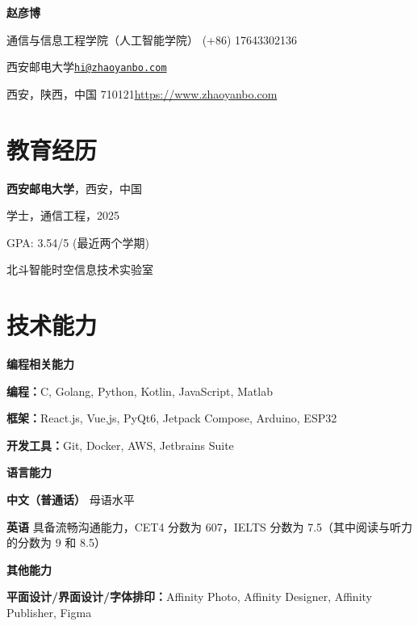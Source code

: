 \documentclass{article}
\newcommand{\cvsection}[1]{\section*{\rmfamily#1}}
\begin{document}
\begin{CJK}{UTF8}{gbsn}

\begin{center}
    \Huge{
    \rmfamily
    \textbf{赵彦博}}
\end{center}
\vspace{20pt}


\setlength{\parskip}{1pt}
\renewcommand{\arraystretch}{1.25}


\noindent 通信与信息工程学院（人工智能学院）  \hfill (+86) 17643302136

\noindent 西安邮电大学\hfill \href{mailto:hi@zhaoyanbo.com}{\texttt{hi@zhaoyanbo.com}}

\noindent 西安，陕西，中国  710121\hfill \url{https://www.zhaoyanbo.com}


\setlength{\parskip}{3pt}


\cvsection{教育经历}
\indent 

\textbf{西安邮电大学}，西安，中国

\hspace{2em}学士，通信工程，2025

\hspace{2em}GPA: 3.54/5 (最近两个学期)

\hspace{2em}北斗智能时空信息技术实验室

\cvsection{技术能力}
\indent 

\textbf{编程相关能力}

\hspace{2em}\textbf{编程：}C, Golang, Python, Kotlin, JavaScript, Matlab

\hspace{2em}\textbf{框架：}React.js, Vue,js, PyQt6, Jetpack Compose, Arduino, ESP32

\hspace{2em}\textbf{开发工具：}Git, Docker, AWS, Jetbrains Suite

\textbf{语言能力}

\hspace{2em}\textbf{中文（普通话）} 母语水平

\hspace{2em}\textbf{英语} 具备流畅沟通能力，CET4 分数为 607，IELTS 分数为 7.5（其中阅读与听力的分数为 9 和 8.5）


\textbf{其他能力}


\hspace{2em}\textbf{平面设计/界面设计/字体排印：}Affinity Photo, Affinity Designer, Affinity Publisher, Figma


\end{CJK}
\end{document}
